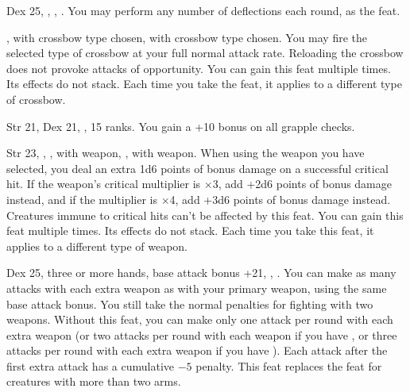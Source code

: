 {Dex 25, , , .}
{You may perform any number of deflections each round, as the  feat.}

{}
{,  with crossbow type chosen,  with crossbow type chosen.}
{You may fire the selected type of crossbow at your full normal attack rate. Reloading the crossbow does not provoke attacks of opportunity.}
{}{You can gain this feat multiple times. Its effects do not stack. Each time you take the feat, it applies to a different type of crossbow.}

{Str 21, Dex 21, ,  15 ranks.}
{You gain a +10 bonus on all grapple checks.}


{}
{Str 23, , ,  with weapon, ,  with weapon.}
{When using the weapon you have selected, you deal an extra 1d6 points of bonus damage on a successful critical hit. If the weapon's critical multiplier is $\times$3, add +2d6 points of bonus damage instead, and if the multiplier is $\times$4, add +3d6 points of bonus damage instead. Creatures immune to critical hits can't be affected by this feat.}
{}{You can gain this feat multiple times. Its effects do not stack. Each time you take this feat, it applies to a different type of weapon.}


{}
{Dex 25, three or more hands, base attack bonus +21, , .}
{You can make as many attacks with each extra weapon as with your primary weapon, using the same base attack bonus. You still take the normal penalties for fighting with two weapons.}
{Without this feat, you can make only one attack per round with each extra weapon (or two attacks per round with each weapon if you have , or three attacks per round with each extra weapon if you have ). Each attack after the first extra attack has a cumulative $-5$ penalty.}
{This feat replaces the  feat for creatures with more than two arms.}


